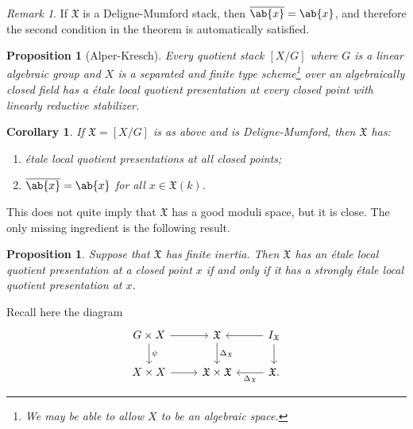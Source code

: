 \documentclass{amsart}
\newtheorem{cor}[thm]{Corollary}
\newtheorem{prop}[thm]{Proposition}
\theoremstyle{definition}
\theoremstyle{remark}
\newtheorem{rmk}[thm]{Remark}
\theoremstyle{plain}
\theoremstyle{definition}
\theoremstyle{remark}
\newcommand{\mf}[1]{\mathfrak{#1}}
\newcommand{\ol}[1]{\overline{#1}}
\newcommand{\1}{\mathbf{1}}
\newcommand{\2}{\mathbf{2}}
\newcommand{\3}{\mathbf{3}}
\begin{document}
\begin{rmk}
    If \(\mf{X}\) is a Deligne-Mumford stack, then \(\ol{\ab\{x\}} = \ab\{x\}\), and therefore the second condition in the theorem is automatically satisfied.
\end{rmk}

\begin{prop}[Alper-Kresch]
    Every quotient stack \([X/G]\) where \(G\) is a linear algebraic group and \(X\) is a separated and finite type scheme\footnote{We may be able to allow \(X\) to be an algebraic space.} over an algebraically closed field has a \'etale local quotient presentation at every closed point with linearly reductive stabilizer.
\end{prop}

\begin{cor}
    If \(\mf{X} = [X/G]\) is as above and is Deligne-Mumford, then \(\mf{X}\) has:
    \begin{enumerate}
        \item \'etale local quotient presentations at all closed points;
        \item \(\ol{\ab\{x\}} = \ab\{x\}\) for all \(x \in \mf{X}(k)\).
    \end{enumerate}
\end{cor}

This does not quite imply that \(\mf{X}\) has a good moduli space, but it is close. The only missing ingredient is the following result.

\begin{prop}
    Suppose that \(\mf{X}\) has finite inertia. Then \(\mf{X}\) has an \'etale local quotient presentation at a closed point \(x\) if and only if it has a strongly \'etale local quotient presentation at \(x\).
\end{prop}

Recall here the diagram
\begin{equation*}
\begin{tikzcd}
    G \times X \ar{r} \ar{d}{\psi} & \mf{X} \ar{d}{\Delta_{\mf{X}}} & I_{\mf{X}} \ar{d} \ar{l} \\
    X \times X \ar{r} & \mf{X} \times \mf{X} & \mf{X} \ar{l}{\Delta_{\mf{X}}}.
\end{tikzcd}
\end{equation*}
\end{document}
